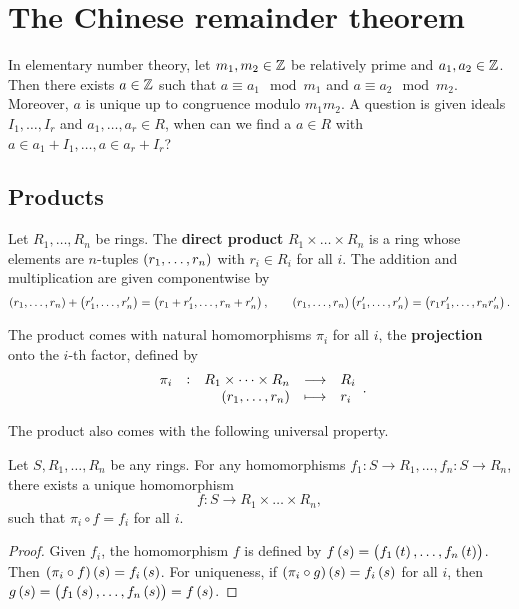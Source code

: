 \pagebreak

\section{The Chinese remainder theorem}

In elementary number theory, let $ m_1, m_2 \in \mathbb{Z} $ be relatively prime and $ a_1, a_2 \in \mathbb{Z} $. Then there exists $ a \in \mathbb{Z} $ such that $ a \equiv a_1 \mod m_1 $ and $ a \equiv a_2 \mod m_2 $. Moreover, $ a $ is unique up to congruence modulo $ m_1m_2 $. A question is given ideals $ I_1, \dots, I_r $ and $ a_1, \dots, a_r \in R $, when can we find a $ a \in R $ with $ a \in a_1 + I_1, \dots, a \in a_r + I_r $?

\subsection{Products}

\begin{definition}
Let $ R_1, \dots, R_n $ be rings. The \textbf{direct product} $ R_1 \times \dots \times R_n $ is a ring whose elements are $ n $-tuples $ \br{r_1, \dots, r_n} $ with $ r_i \in R_i $ for all $ i $. The addition and multiplication are given componentwise by
$$ \br{r_1, \dots, r_n} + \br{r_1', \dots, r_n'} = \br{r_1 + r_1', \dots, r_n + r_n'}, \qquad \br{r_1, \dots, r_n}\br{r_1', \dots, r_n'} = \br{r_1r_1', \dots, r_nr_n'}. $$
\end{definition}

\begin{note*}
The product comes with natural homomorphisms $ \pi_i $ for all $ i $, the \textbf{projection} onto the $ i $-th factor, defined by
$$ \function[\pi_i]{R_1 \times \dots \times R_n}{R_i}{\br{r_1, \dots, r_n}}{r_i}. $$
\end{note*}

The product also comes with the following universal property.

\begin{theorem}
Let $ S, R_1, \dots, R_n $ be any rings. For any homomorphisms $ f_1 : S \to R_1, \dots, f_n : S \to R_n $, there exists a unique homomorphism
$$ f : S \to R_1 \times \dots \times R_n, $$
such that $ \pi_i \circ f = f_i $ for all $ i $.
\end{theorem}

\begin{proof}
Given $ f_i $, the homomorphism $ f $ is defined by $ f\br{s} = \br{f_1\br{t}, \dots, f_n\br{t}} $. Then $ \br{\pi_i \circ f}\br{s} = f_i\br{s} $. For uniqueness, if $ \br{\pi_i \circ g}\br{s} = f_i\br{s} $ for all $ i $, then $ g\br{s} = \br{f_1\br{s}, \dots, f_n\br{s}} = f\br{s} $.
\end{proof}

